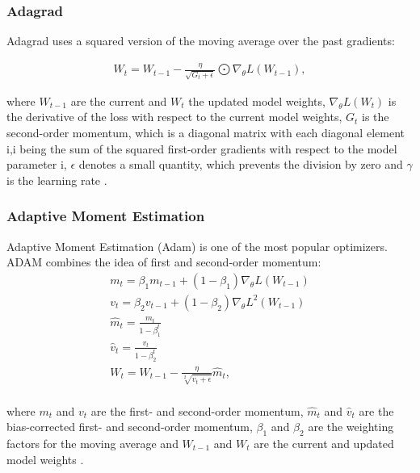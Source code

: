 \subsubsection{Adagrad}
Adagrad uses a squared version of the moving average over the past gradients:

\begin{equation}
    \begin{aligned}
    W_{t} = W_{t-1} - \frac{\eta}{\sqrt{G_{t}+ \epsilon}} \bigodot \nabla_{\theta}L(W_{t-1}),
    \end{aligned}
    \label{eq:Adagrad}
\end{equation}
    
where  $W_{t-1}$ are the current and $W_{t}$ the updated model weights, $\nabla_{\theta}L(W_{t})$ is the derivative of the loss with respect to the current model weights, $G_{t}$ is the second-order momentum, which is a diagonal matrix with each diagonal element i,i being the sum of the squared first-order gradients with respect to the model parameter i, $\epsilon$ denotes a small quantity, which prevents the division by zero and $\gamma$ is the learning rate \cite{Ruder2016}.


\subsubsection{Adaptive Moment Estimation}
Adaptive Moment Estimation (Adam) is one of the most popular optimizers. ADAM combines the idea of first and second-order momentum: 
\begin{equation}
    \begin{aligned}
    &m_{t} =  \beta_{1} m_{t-1} +  (1-\beta_{1}) \nabla_{\theta}L(W_{t-1}) &\\
    &v_{t} =  \beta_{2} v_{t-1} +  (1-\beta_{2}) \nabla_{\theta}L^{2}(W_{t-1}) &\\
    &\hat{m}_{t} = \frac{m_{t}}{1-\beta_{1}^{t}}&\\
    &\hat{v}_{t} = \frac{v_{t}}{1-\beta_{2}^{t}}&\\
    & W_{t} = W_{t-1} - \frac{\eta}{\sqrt[2]{\hat{v}_{t} + \epsilon}}\hat{m}_{t}, &\\
    \end{aligned}
    \label{eq:ADAM}
\end{equation}
    
where $m_{t}$ and $v_{t}$ are the first- and second-order momentum, $\hat{m}_{t}$ and $\hat{v}_{t}$ are the bias-corrected first- and second-order momentum, $\beta_{1}$ and $\beta_{2}$ are the weighting factors for the moving average and $W_{t-1}$ and  $W_{t}$ are the current and updated model weights \cite{Ruder2016}.

